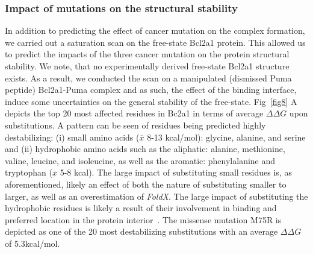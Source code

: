 \documentclass[10pt,letterpaper]{article}
\begin{document}
\subsubsection*{Impact of mutations on the structural stability}

In addition to predicting the effect of cancer mutation on the complex formation, we carried out a saturation scan on the free-state Bcl2a1 protein. This allowed us to predict the impacts of the three cancer mutation on the protein structural stability. We note, that no experimentally derived free-state Bcl2a1 structure exists. As a result, we conducted the scan on a manipulated (dismissed Puma peptide) Bcl2a1-Puma complex and as such, the effect of the binding interface, induce some uncertainties on the general stability of the free-state. 
Fig~\ref{fig8} A depicts the top 20 most affected residues in Bc2a1 in terms of average $\Delta\Delta G$ upon substitutions. A pattern can be seen of residues being predicted highly destabilizing: (i) small amino acids ($\overline{x}$ 8-13 kcal/mol): glycine, alanine, and serine and (ii) hydrophobic amino acids such as the aliphatic: alanine, methionine, valine, leucine, and isoleucine, as well as the aromatic: phenylalanine and tryptophan ($\overline{x}$ 5-8 kcal). The large impact of substituting small residues is, as aforementioned, likely an effect of both the nature of substituting smaller to larger, as well as an overestimation of \textit{FoldX}. The large impact of substituting the hydrophobic residues is likely a result of their involvement in binding and preferred location in the protein interior~\cite{Betts2007}. The missense mutation M75R is depicted as one of the 20 most destabilizing substitutions with an average $\Delta\Delta G$ of 5.3kcal/mol. 
\end{document}
